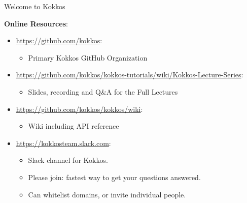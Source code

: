 \begin{frame}{Welcome to Kokkos}

\textbf{Online Resources}:

\begin{itemize}
        \item \url{https://github.com/kokkos}:
                \begin{itemize}
                        \item Primary Kokkos GitHub Organization
                \end{itemize}
        \item \url{https://github.com/kokkos/kokkos-tutorials/wiki/Kokkos-Lecture-Series}:
                \begin{itemize}
			\item{Slides, recording and Q\&A for the Full Lectures}
                \end{itemize}
        \item \url{https://github.com/kokkos/kokkos/wiki}:
                \begin{itemize}
                        \item Wiki including API reference
                \end{itemize}
        \item \url{https://kokkosteam.slack.com}:
                \begin{itemize}
                        \item Slack channel for Kokkos.
                        \item Please join: fastest way to get your questions answered.
                        \item Can whitelist domains, or invite individual people.
                \end{itemize}
\end{itemize}

\end{frame}















